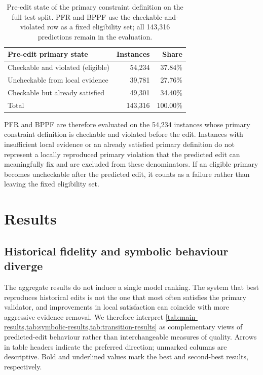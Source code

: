 \documentclass[a4paper,UKenglish,cleveref,autoref,thm-restate]{tgdk-v2021}
\begin{document}
\begin{table}[H]
\caption{Pre-edit state of the primary constraint definition on the full test split. PFR and BPPF use the checkable-and-violated row as a fixed eligibility set; all 143,316 predictions remain in the evaluation.}
\label{tab:primary-eligibility}
\centering
\small
\begin{tabular}{lrr}
\toprule
\textbf{Pre-edit primary state} & \textbf{Instances} & \textbf{Share} \\
\midrule
Checkable and violated (eligible) & 54,234 & 37.84\% \\
Uncheckable from local evidence & 39,781 & 27.76\% \\
Checkable but already satisfied & 49,301 & 34.40\% \\
\midrule
Total & 143,316 & 100.00\% \\
\bottomrule
\end{tabular}
\end{table}

PFR and BPPF are therefore evaluated on the 54,234 instances whose primary constraint definition is checkable and violated before the edit. Instances with insufficient local evidence or an already satisfied primary definition do not represent a locally reproduced primary violation that the predicted edit can meaningfully fix and are excluded from these denominators. If an eligible primary becomes uncheckable after the predicted edit, it counts as a failure rather than leaving the fixed eligibility set.


\section{Results}
\label{sec:results}

\subsection{Historical fidelity and symbolic behaviour diverge}
\label{subsec:aggregate-results}

The aggregate results do not induce a single model ranking. The system that best reproduces historical edits is not the one that most often satisfies the primary validator, and improvements in local satisfaction can coincide with more aggressive evidence removal. We therefore interpret \cref{tab:main-results,tab:symbolic-results,tab:transition-results} as complementary views of predicted-edit behaviour rather than interchangeable measures of quality. Arrows in table headers indicate the preferred direction; unmarked columns are descriptive. Bold and underlined values mark the best and second-best results, respectively.
\end{document}
